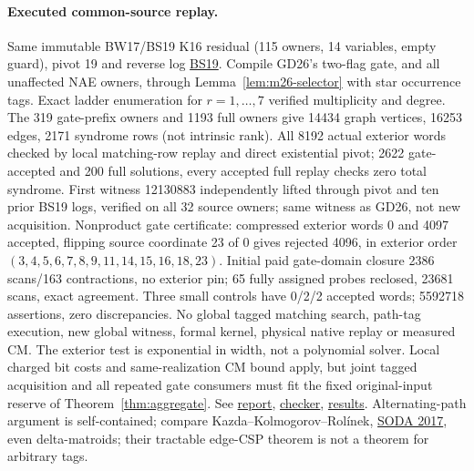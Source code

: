 \documentclass[11pt]{article}
\begin{document}
\paragraph{Executed common-source replay.}
Same immutable BW17/BS19 K16 residual (115 owners, 14 variables, empty guard), pivot 19 and reverse log \href{https://github.com/j15marti/pnp/commit/ff92a1c3d44e4b48dc9a7bf215825075396cae5a}{BS19}. Compile GD26's two-flag gate, and all unaffected NAE owners, through Lemma~\ref{lem:m26-selector} with star occurrence tags. Exact ladder enumeration for $r=1,\ldots,7$ verified multiplicity and degree. The 319 gate-prefix owners and 1193 full owners give 14434 graph vertices, 16253 edges, 2171 syndrome rows (not intrinsic rank). All 8192 actual exterior words checked by local matching-row replay and direct existential pivot; 2622 gate-accepted and 200 full solutions, every accepted full replay checks zero total syndrome. First witness 12130883 independently lifted through pivot and ten prior BS19 logs, verified on all 32 source owners; same witness as GD26, not new acquisition. Nonproduct gate certificate: compressed exterior words 0 and 4097 accepted, flipping source coordinate 23 of 0 gives rejected 4096, in exterior order $(3,4,5,6,7,8,9,11,14,15,16,18,23)$. Initial paid gate-domain closure 2386 scans/163 contractions, no exterior pin; 65 fully assigned probes reclosed, 23681 scans, exact agreement. Three small controls have 0/2/2 accepted words; 5592718 assertions, zero discrepancies. No global tagged matching search, path-tag execution, new global witness, formal kernel, physical native replay or measured CM. The exterior test is exponential in width, not a polynomial solver. Local charged bit costs and same-realization CM bound apply, but joint tagged acquisition and all repeated gate consumers must fit the fixed original-input reserve of Theorem~\ref{thm:aggregate}. See \href{https://github.com/j15marti/pnp/commit/a5c0200e603a2d3628d3b843481fd6774224c5b8}{report}, \href{https://github.com/j15marti/pnp/commit/60f53bc87cd4e8d1cb773aedc4daf96b48e22c2d}{checker}, \href{https://github.com/j15marti/pnp/commit/f437e9aba91947efe7a05036b9cede65cb3121b7}{results}. Alternating-path argument is self-contained; compare Kazda--Kolmogorov--Rol\'inek, \href{https://doi.org/10.1137/1.9781611974782.20}{SODA 2017}, even delta-matroids; their tractable edge-CSP theorem is not a theorem for arbitrary tags.
\end{document}
